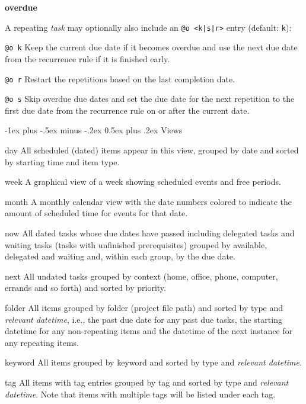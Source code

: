 \documentclass[9pt,landscape]{article}
\makeatletter
\renewcommand{\section}{\@startsection{section}{1}{0mm}%
                                {-1ex plus -.5ex minus -.2ex}%
                                {0.5ex plus .2ex}%
                                {\normalfont\large\bfseries}}
\makeatother
\begin{document}
\begin{multicols}{3}
\textbf{overdue}

A repeating \emph{task} may optionally also include an \verb!@o <k|s|r>! entry (default: \verb'k'):

\begin{compactdesc}
   \item[\texttt{@o k}] Keep the current due date if it becomes overdue and use the next due date from the recurrence rule if it is finished early.
   \item[\texttt{@o r}] Restart the repetitions based on the last completion date.
   \item[\texttt{@o s}] Skip overdue due dates and set the due date for the next repetition to the first due date from the recurrence rule on or after the current date.
\end{compactdesc}


\section{Views}

\begin{compactdesc}
  \item[day] All scheduled (dated) items appear in this view, grouped by date and sorted by starting time and item type.
  \item[week] A graphical view of a week showing scheduled events and free periods.
  \item[month] A monthly calendar view with the date numbers colored to indicate the amount of scheduled time for events for that date.
  \item[now] All dated tasks whose due dates have passed including delegated tasks and waiting tasks (tasks with unfinished prerequisites) grouped by available, delegated and waiting and, within each group, by the due date.
  \item[next] All undated tasks grouped by context (home, office, phone, computer, errands and so forth) and sorted by priority.
  \item[folder] All items grouped by folder (project file path) and sorted by type and \emph{relevant datetime}, i.e., the past due date for any past due tasks, the starting datetime for any non-repeating items and the datetime of the next instance for any repeating items.
  \item[keyword] All items grouped by keyword and sorted by type and \emph{relevant datetime}.
  \item[tag] All items with tag entries grouped by tag and sorted by type and \emph{relevant datetime}. Note that items with multiple tags will be listed under each tag.
\end{compactdesc}


\end{multicols}
\end{document}
